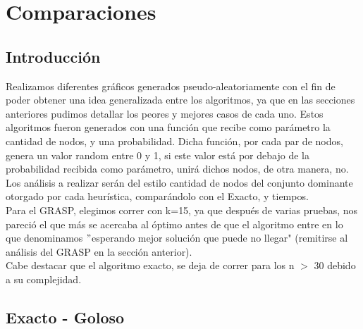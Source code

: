 \section{Comparaciones}

\subsection{Introducción}

Realizamos diferentes gráficos generados pseudo-aleatoriamente con el fin de poder obtener una idea generalizada entre los algoritmos, ya que en las secciones anteriores pudimos
detallar los peores y mejores casos de cada uno. Estos algoritmos fueron generados con una función que recibe como parámetro la cantidad de nodos, y una probabilidad. Dicha función, por cada par de nodos, genera un valor random entre 0 y 1, si este valor está por debajo de la probabilidad recibida como parámetro, unirá dichos nodos, de otra manera, no.\\
Los análisis a realizar serán del estilo cantidad de nodos del conjunto dominante otorgado por cada heurística, comparándolo con el Exacto, y tiempos.\\
Para el GRASP, elegimos correr con k=15, ya que después de varias pruebas, nos pareció el que más se acercaba al óptimo antes de que el algoritmo entre en lo que denominamos $"$esperando mejor solución que puede no llegar" (remitirse al análisis del GRASP en la sección anterior).\\
Cabe destacar que el algoritmo exacto, se deja de correr para los n $>$ 30 debido a su complejidad.


\subsection{Exacto - Goloso}

